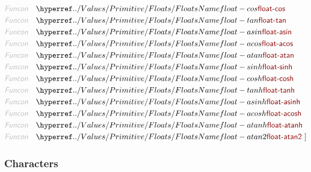 \begin{align*}
  \KEY{Funcon} \quad & \NAMEHYPER{../Values/Primitive}{Floats}{float-cos} \\
  \KEY{Funcon} \quad & \NAMEHYPER{../Values/Primitive}{Floats}{float-tan} \\
  \KEY{Funcon} \quad & \NAMEHYPER{../Values/Primitive}{Floats}{float-asin} \\
  \KEY{Funcon} \quad & \NAMEHYPER{../Values/Primitive}{Floats}{float-acos} \\
  \KEY{Funcon} \quad & \NAMEHYPER{../Values/Primitive}{Floats}{float-atan} \\
  \KEY{Funcon} \quad & \NAMEHYPER{../Values/Primitive}{Floats}{float-sinh} \\
  \KEY{Funcon} \quad & \NAMEHYPER{../Values/Primitive}{Floats}{float-cosh} \\
  \KEY{Funcon} \quad & \NAMEHYPER{../Values/Primitive}{Floats}{float-tanh} \\
  \KEY{Funcon} \quad & \NAMEHYPER{../Values/Primitive}{Floats}{float-asinh} \\
  \KEY{Funcon} \quad & \NAMEHYPER{../Values/Primitive}{Floats}{float-acosh} \\
  \KEY{Funcon} \quad & \NAMEHYPER{../Values/Primitive}{Floats}{float-atanh} \\
  \KEY{Funcon} \quad & \NAMEHYPER{../Values/Primitive}{Floats}{float-atan2}
  \ ]
\end{align*}
\subsubsection{Characters}\hypertarget{characters}{}\label{characters}

